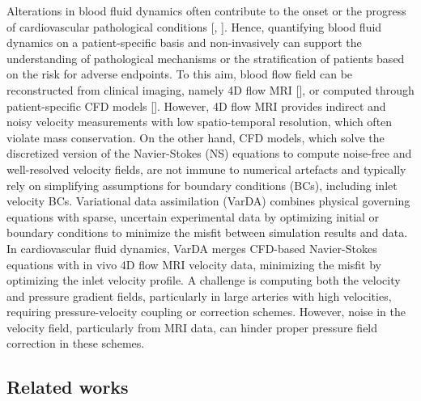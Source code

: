 Alterations in blood fluid dynamics often contribute to the onset or the progress of cardiovascular pathological conditions [\cite{Bappoo2021}, \cite{Guzzardi2015}]. Hence, quantifying blood fluid dynamics on a patient-specific basis and non-invasively can support the understanding of pathological mechanisms or the stratification of patients based on the risk for adverse endpoints. To this aim, blood flow field can be reconstructed from clinical imaging, namely 4D flow MRI [\cite{Dyverfeldt2015}], or computed through patient-specific CFD models  [\cite{Kheyfets2015}]. 
However, 4D flow MRI provides indirect and noisy velocity measurements with low spatio-temporal resolution, which often violate mass conservation. On the other hand, CFD models, which solve the discretized version of the Navier-Stokes (NS) equations to compute noise-free and well-resolved velocity fields, are not immune to numerical artefacts %
and typically rely on simplifying assumptions for boundary conditions (BCs), including inlet velocity BCs. 
Variational data assimilation (VarDA) combines physical governing equations with sparse, uncertain experimental data by optimizing initial or boundary conditions to minimize the misfit between simulation results and data. In cardiovascular fluid dynamics, VarDA merges CFD-based Navier-Stokes equations with in vivo 4D flow MRI velocity data, minimizing the misfit by optimizing the inlet velocity profile. A challenge is computing both the velocity and pressure gradient fields, particularly in large arteries with high velocities, requiring pressure-velocity coupling or correction schemes. However, noise in the velocity field, particularly from MRI data, can hinder proper pressure field correction in these schemes.

\subsection*{Related works}
\label{sec:background}

